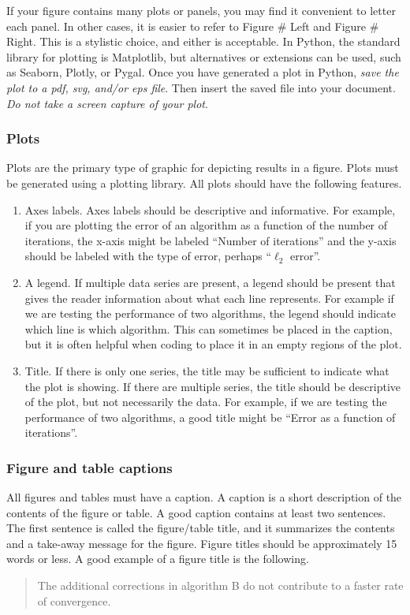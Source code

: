 \documentclass[]{article}
\begin{document}
If your figure contains many plots or panels, you may find it convenient to letter each panel. In other cases, it is easier to refer to Figure \# Left and Figure \# Right. This is a stylistic choice, and either is acceptable.
In Python, the standard library for plotting is Matplotlib, but alternatives or extensions can be used, such as Seaborn, Plotly, or Pygal.
Once you have generated a plot in Python, \emph{save the plot to a pdf, svg, and/or eps file}. Then insert the saved file into your document. \emph{Do not take a screen capture of your plot}.

\subsubsection{Plots}
Plots are the primary type of graphic for depicting results in a figure. Plots must be generated using a plotting library. All plots should have the following features.
\begin{enumerate}
    \item Axes labels. Axes labels should be descriptive and informative. For example, if you are plotting the error of an algorithm as a function of the number of iterations, the x-axis might be labeled ``Number of iterations'' and the y-axis should be labeled with the type of error, perhaps ``$\ell_2$ error''.
    \item A legend. If multiple data series are present, a legend should be present that gives the reader information about what each line represents. For example if we are testing the performance of two algorithms, the legend should indicate which line is which algorithm. This can sometimes be placed in the caption, but it is often helpful when coding to place it in an empty regions of the plot.
    \item Title. If there is only one series, the title may be sufficient to indicate what the plot is showing. If there are multiple series, the title should be descriptive of the plot, but not necessarily the data. For example, if we are testing the performance of two algorithms, a good title might be ``Error as a function of iterations''.
\end{enumerate}

\subsubsection{Figure and table captions}

All figures and tables must have a caption. A caption is a short description of the contents of the figure or table. A good caption contains at least two sentences. The first sentence is called the figure/table title, and it summarizes the contents and a take-away message for the figure. Figure titles should be approximately 15  words or less.
A good example of a figure title is the following.
\begin{quote}
    The additional corrections in algorithm B do not contribute to a faster rate of convergence.
\end{quote}
\end{document}
